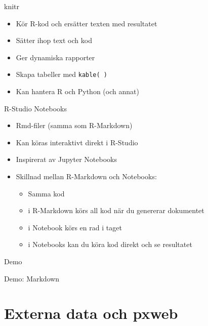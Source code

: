 \documentclass[
  11pt,
  ignorenonframetext,
  handout]{beamer}
\providecommand{\tightlist}{%
  \setlength{\itemsep}{0pt}\setlength{\parskip}{0pt}}
\begin{document}
\begin{frame}{knitr}
\label{knitr}
\begin{itemize}
\tightlist
\item
  Kör R-kod och ersätter texten med resultatet
\item
  Sätter ihop text och kod
\item
  Ger dynamiska rapporter
\item
  Skapa tabeller med \texttt{kable( )}
\item
  Kan hantera R och Python (och annat)
\end{itemize}
\end{frame}

\begin{frame}{R-Studio Notebooks}
\label{r-studio-notebooks}
\begin{itemize}
\tightlist
\item
  Rmd-filer (samma som R-Markdown)
\item
  Kan köras interaktivt direkt i R-Studio
\item
  Inspirerat av Jupyter Notebooks
\item
  Skillnad mellan R-Markdown och Notebooks:

  \begin{itemize}
  \tightlist
  \item
    Samma kod
  \item
    i R-Markdown körs all kod när du genererar dokumentet
  \item
    i Notebook körs en rad i taget
  \item
    i Notebooks kan du köra kod direkt och se resultatet
  \end{itemize}
\end{itemize}
\end{frame}

\begin{frame}{Demo}
\label{demo-2}
\begin{block}{Demo: Markdown}
\label{demo-markdown}
\end{block}
\end{frame}

\section{Externa data och pxweb}\label{externa-data-och-pxweb}
\end{document}
